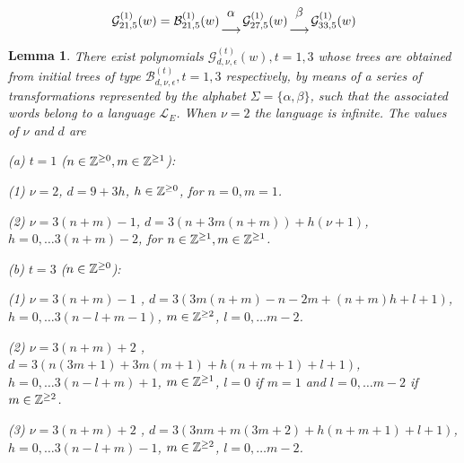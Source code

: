 \documentclass{birkjour_t2}
\newtheorem{lem}[thm]{Lemma}
\theoremstyle{definition}
\theoremstyle{remark}
\numberwithin{equation}{section}
\begin{document}
         \begin{equation} 
{\mathcal{G}}^{(1)}_{21, 5}(w) ={\mathcal{B}}^{(1)}_{21, 5}(w)  { \alpha \atop \longrightarrow } {\mathcal{G}}^{(1)}_{27,5}(w)   { \beta \atop \longrightarrow } {\mathcal{G}}^{(1)}_{33,5}(w)
    \end{equation} 
    \par
    \begin{lem}     There exist polynomials  ${\mathcal{G}}^{(t)}_{d,\nu,\epsilon}(w), t=1, 3$ whose trees are obtained from initial trees of type ${\mathcal{B}}_{d,\nu,\epsilon}^{(t)}, t=1,3$ respectively, by means of a series of transformations represented by the alphabet $\Sigma=\{\alpha, \beta\}$, such that the associated words belong to a language $\mathcal{L}_{E}$.  When $\nu=2$ the language is infinite. The values of $\nu$  and  $d$ are
      \bigskip\par\noindent    
   (a) $t=1$ ($n\in {\Bbb{Z}}^{\geq 0},  m\in {\Bbb{Z}}^{\geq 1}$): 
   
   (1) $\nu=2$, $d=9+3h$, $h\in {\Bbb{Z}}^{\geq 0}$, for $n=0, m=1$.
   
   (2) $\nu=3(n+m)-1$, $d=3(n+3m(n+m))+h(\nu+1)$, $h=0, \dots 3(n+m)-2$, for $n\in {\Bbb{Z}}^{\geq 1},  m\in {\Bbb{Z}}^{\geq 1}$. 

\par\noindent  
   (b) $t=3$ ($n\in {\Bbb{Z}}^{\geq 0}$): 
   
   (1) $\nu=3(n+m)-1$ , $d=3(3m(n+m)-n-2m+(n+m)h+l+1)$, $h=0, \dots 3(n-l+m-1)$, $m\in {\Bbb{Z}}^{\geq 2}$, $l=0, \dots m-2$.
   
     (2) $\nu=3(n+m)+2$ , $d=3(n(3m+1)+3m(m+1)+h(n+m+1)+l+1)$, $h=0, \dots 3(n-l+m)+1$, $m\in {\Bbb{Z}}^{\geq 1}$, $l=0$ if $m=1$ and $l=0, \dots m-2$ if $m\in {\Bbb{Z}}^{\geq 2}$.
   
       (3) $\nu=3(n+m)+2$ , $d=3(3nm+m(3m+2)+h(n+m+1)+l+1)$, $h=0, \dots 3(n-l+m)-1$, $m\in {\Bbb{Z}}^{\geq 2}$, $l=0, \dots m-2$.
     
     \end{lem}
\end{document}

